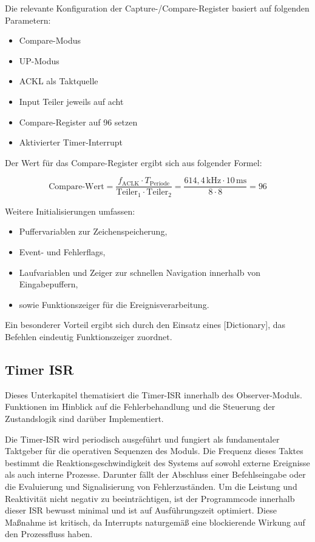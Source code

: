 Die relevante Konfiguration der Capture-/Compare-Register basiert auf folgenden Parametern:

\begin{itemize}
	\item Compare-Modus
	\item UP-Modus
	\item ACKL als Taktquelle
	\item Input Teiler jeweils auf acht
	\item Compare-Register auf 96 setzen
	\item Aktivierter Timer-Interrupt
\end{itemize}

Der Wert f\"ur das Compare-Register ergibt sich aus folgender Formel:

\[
\text{Compare-Wert} = \frac{f_\text{ACLK} \cdot T_\text{Periode}}{\text{Teiler}_1 \cdot \text{Teiler}_2} = \frac{614{,}4\,\text{kHz} \cdot 10\,\text{ms}}{8 \cdot 8} = 96
\]

Weitere Initialisierungen umfassen:
\begin{itemize}
	\item Puffervariablen zur Zeichenspeicherung,
	\item Event- und Fehlerflags,
	\item Laufvariablen und Zeiger zur schnellen Navigation innerhalb von Eingabepuffern,
	\item sowie Funktionszeiger f\"ur die Ereignisverarbeitung.
\end{itemize}

Ein besonderer Vorteil ergibt sich durch den Einsatz eines [Dictionary], das Befehlen eindeutig Funktionszeiger zuordnet.


\newpage
\subsection{Timer ISR}
\label{Timer_ISR}

Dieses Unterkapitel thematisiert die Timer-ISR innerhalb des Observer-Moduls. Funktionen im Hinblick auf die Fehlerbehandlung und die Steuerung der Zustandslogik sind dar\"uber Implementiert.

Die Timer-ISR wird periodisch ausgef\"uhrt und fungiert als fundamentaler Taktgeber f\"ur die operativen Sequenzen des Moduls. Die Frequenz dieses Taktes bestimmt die Reaktionsgeschwindigkeit des Systems auf sowohl externe Ereignisse als auch interne Prozesse. Darunter f\"allt der Abschluss einer Befehlseingabe oder die Evaluierung und Signalisierung von Fehlerzust\"anden. Um die Leistung und Reaktivit\"at nicht negativ zu beeintr\"achtigen, ist der Programmcode innerhalb dieser ISR bewusst minimal und ist auf Ausf\"uhrungszeit optimiert. Diese Ma{\ss}nahme ist kritisch, da Interrupts naturgem\"a{\ss} eine blockierende Wirkung auf den Prozessfluss haben.

